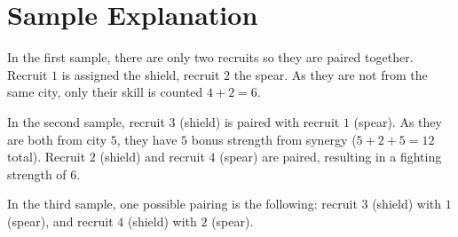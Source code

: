 \section*{Sample Explanation}

In the first sample, there are only two recruits so they are paired together.
Recruit $1$ is assigned the shield, recruit $2$ the spear.
As they are not from the same city, only their skill is counted $4 + 2 = 6$.

In the second sample, recruit $3$ (shield) is paired with recruit $1$ (spear).
As they are both from city $5$, they have $5$ bonus strength from synergy ($5 + 2 + 5 = 12$ total).
Recruit $2$ (shield) and recruit $4$ (spear) are paired, resulting in a fighting strength of $6$.

In the third sample, one possible pairing is the following:
recruit $3$ (shield) with $1$ (spear), and recruit $4$ (shield) with $2$ (spear).
